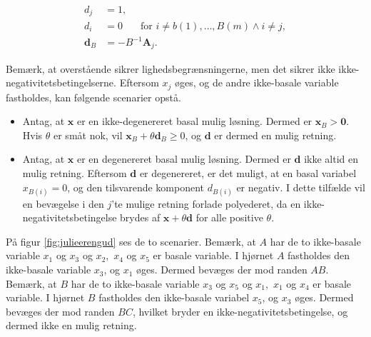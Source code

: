 {\begin{defn}{}{}
%
\begin{align*}
d_j & = 1, \\
d_i & = 0 \phantom{hej} \text{ for } i \neq b(1), \ldots , B(m) \wedge i \neq j, \\
\mathbf{d}_B & = - B^{-1} \mathbf{A}_j.
\end{align*}
% 
\end{defn}
\noindent
%
Bemærk, at overstående sikrer lighedsbegrænsningerne, men det sikrer ikke ikke-negativitetsbetingelserne. 
Eftersom $x_j$ øges, og de andre ikke-basale variable fastholdes, kan følgende scenarier opstå. 
\begin{itemize}
\item Antag, at $\mathbf{x}$ er en ikke-degenereret basal mulig løsning. 
Dermed er $\mathbf{x}_B > \mathbf{0}$. 
Hvis $\theta$ er småt nok, vil $\mathbf{x}_B + \theta \mathbf{d}_B \geq 0 $, og $\mathbf{d}$ er dermed en mulig retning. 
\item Antag, at $\mathbf{x}$ er en degenereret basal mulig løsning. 
Dermed er $\mathbf{d}$ ikke altid en mulig retning. 
Eftersom $\mathbf{d}$ er degenereret, er det muligt, at en basal variabel $x_{B(i)}=0$, og den tilsvarende komponent $d_{B(i)}$ er negativ. 
I dette tilfælde vil en bevægelse i den $j$'te mulige retning forlade polyederet, da en ikke-negativitetsbetingelse brydes af $\mathbf{x} + \theta \mathbf{d}$ for alle positive $\theta$.
\end{itemize}
%
På figur \ref{fig:julieerengud} ses de to scenarier. 
Bemærk, at $A$ har de to ikke-basale variable $x_1$ og $x_3$ og $x_2,$ $x_4$ og $x_5$ er basale variable.
I hjørnet $A$ fastholdes den ikke-basale variable $x_3$, og $x_1$ øges. 
Dermed bevæges der mod randen $AB$. 
Bemærk, at $B$ har de to ikke-basale variable $x_3$ og $x_5$ og $x_1,$ $x_1$ og $x_4$ er basale variable.
I hjørnet $B$ fastholdes den ikke-basale variabel $x_5$, og $x_3$ øges. 
Dermed bevæges der mod randen $BC$, hvilket bryder en ikke-negativitetsbetingelse, og dermed ikke en mulig retning. 
}
%
